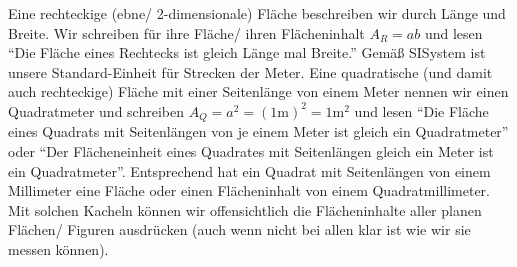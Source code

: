 \documentclass[a4paper]{book}%
\theoremstyle{definition}
\begin{document}
Eine rechteckige (ebne/ 2-dimensionale) Fläche beschreiben wir durch Länge und Breite. Wir schreiben für ihre Fläche/ ihren Flächeninhalt $A_R = a b$ und lesen \enquote{Die Fläche eines Rechtecks ist gleich Länge mal Breite.} Gemäß \gls{SISystem} ist unsere Standard-Einheit für Strecken der Meter. Eine quadratische (und damit auch rechteckige) Fläche mit einer Seitenlänge von einem Meter nennen wir einen Quadratmeter und schreiben $A_Q = a^2 = (1\text{m})^2 = 1\text{m}^2$ und lesen \enquote{Die Fläche eines Quadrats mit Seitenlängen von je einem Meter ist gleich ein Quadratmeter} oder \enquote{Der Flächeneinheit eines Quadrates mit Seitenlängen gleich ein Meter ist ein Quadratmeter}. Entsprechend hat ein Quadrat mit Seitenlängen von einem Millimeter eine Fläche oder einen Flächeninhalt von einem Quadratmillimeter. Mit solchen Kacheln können wir offensichtlich die Flächeninhalte aller planen Flächen/ Figuren ausdrücken (auch wenn nicht bei allen klar ist wie wir sie messen können).
\end{document}
